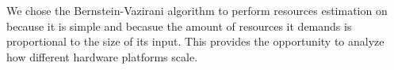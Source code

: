 
We chose the Bernstein-Vazirani algorithm to perform resources estimation on because it is simple and becasue the amount of resources it demands is proportional to the size of its input. This provides the opportunity to analyze how different hardware platforms scale.
